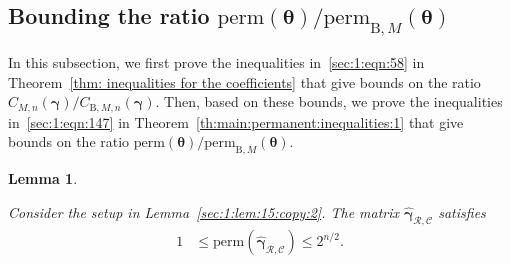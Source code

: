 \documentclass[journal,lettersize,twocolumn]{IEEEtran} %
\newtheorem{lemma}[theorem]{Lemma}
\newcommand{\vect}[1]{ \bm{#1} }
\newcommand{\set}[1]{\mathcal{#1}}
\newcommand{\vgam}{ \vect{\gamma} }
\newcommand{\matr}[1]{ \bm{#1} }
\newcommand{\perm}{ \mathrm{perm} }
\newcommand{\permbM}[1]{\perm_{ \mathrm{B}, #1 }}
\newcommand{\setC}{\set{C}}
\newcommand{\setR}{\set{R}}
\newcommand{\CM}[1]{\Cgen{M}{#1}}
\newcommand{\Cgen}[2]{C_{#1,#2}}
\newcommand{\CBM}[1]{\CBgen{M}{#1}}
\newcommand{\CBgen}[2]{C_{\mathrm{B},#1,#2}}
\newcommand{\mtheta}{\matr{\theta}}
\newcommand{\hvgamRCp}{ \hat{\vgam}_{\setR,\setC} }
\begin{document}
%
%

\subsection{\texorpdfstring{Bounding the ratio $\perm(\mtheta) /  
                                                                                     \permbM{M}(\mtheta)$}{}}

%

In this subsection, we first prove the inequalities in~\eqref{sec:1:eqn:58} in
Theorem~\ref{thm: inequalities for the coefficients} that give bounds on the
ratio $\CM{n}(\vgam) / \CBM{n}(\vgam)$. Then, based on these bounds, we prove
the inequalities in~\eqref{sec:1:eqn:147} in
Theorem~\ref{th:main:permanent:inequalities:1} that give bounds on the ratio
$\perm(\mtheta) / \permbM{M}(\mtheta)$.

%

\begin{lemma}
  \label{sec:1:lem:17}

  Consider the setup in Lemma~\ref{sec:1:lem:15:copy:2}. The matrix
  $\hvgamRCp$ satisfies
  \begin{align}
    1
      &\leq  
         \perm(\hvgamRCp)
       \leq
         2^{n/2}.
           \label{sec:1:eqn:145}
  \end{align}
\end{lemma}

%
\end{document}
